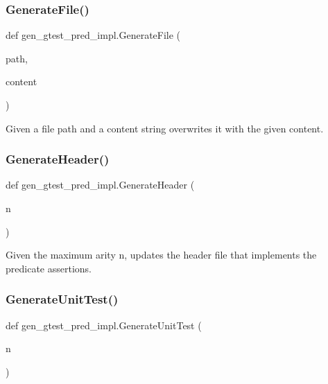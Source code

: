 \subsubsection{\texorpdfstring{GenerateFile()}{GenerateFile()}}
{\footnotesize\ttfamily def gen\+\_\+gtest\+\_\+pred\+\_\+impl.\+Generate\+File (\begin{DoxyParamCaption}\item[{}]{path,  }\item[{}]{content }\end{DoxyParamCaption})}

\begin{DoxyVerb}Given a file path and a content string
   overwrites it with the given content.
\end{DoxyVerb}
 \mbox{\label{namespacegen__gtest__pred__impl_a6f3039a82a5283846fb272f8a3af6743}} 
\subsubsection{\texorpdfstring{GenerateHeader()}{GenerateHeader()}}
{\footnotesize\ttfamily def gen\+\_\+gtest\+\_\+pred\+\_\+impl.\+Generate\+Header (\begin{DoxyParamCaption}\item[{}]{n }\end{DoxyParamCaption})}

\begin{DoxyVerb}Given the maximum arity n, updates the header file that implements
the predicate assertions.
\end{DoxyVerb}
 \mbox{\label{namespacegen__gtest__pred__impl_acbd42b5b7fb7ddbb06a4dd58fc37e9ed}} 
\subsubsection{\texorpdfstring{GenerateUnitTest()}{GenerateUnitTest()}}
{\footnotesize\ttfamily def gen\+\_\+gtest\+\_\+pred\+\_\+impl.\+Generate\+Unit\+Test (\begin{DoxyParamCaption}\item[{}]{n }\end{DoxyParamCaption})}

